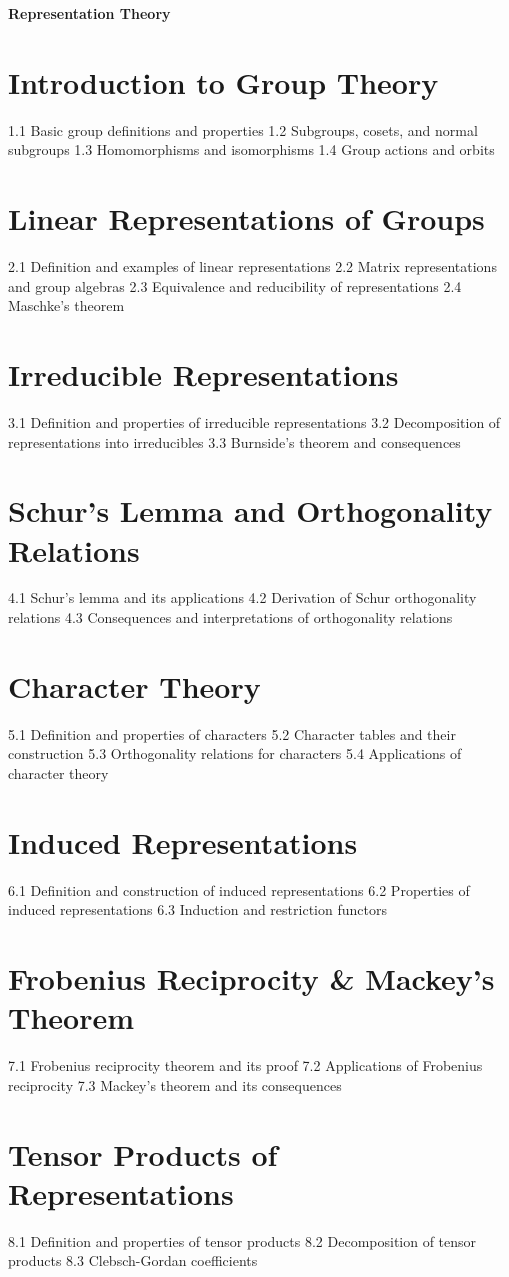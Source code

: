 {\LARGE \bf{Representation Theory}}
\section{Introduction to Group Theory}
1.1 Basic group definitions and properties
1.2 Subgroups, cosets, and normal subgroups
1.3 Homomorphisms and isomorphisms
1.4 Group actions and orbits
\section{Linear Representations of Groups}
2.1 Definition and examples of linear representations
2.2 Matrix representations and group algebras
2.3 Equivalence and reducibility of representations
2.4 Maschke's theorem
\section{Irreducible Representations}
3.1 Definition and properties of irreducible representations
3.2 Decomposition of representations into irreducibles
3.3 Burnside's theorem and consequences
\section{Schur's Lemma and Orthogonality Relations}
4.1 Schur's lemma and its applications
4.2 Derivation of Schur orthogonality relations
4.3 Consequences and interpretations of orthogonality relations
\section{Character Theory}
5.1 Definition and properties of characters
5.2 Character tables and their construction
5.3 Orthogonality relations for characters
5.4 Applications of character theory
\section{Induced Representations}
6.1 Definition and construction of induced representations
6.2 Properties of induced representations
6.3 Induction and restriction functors
\section{Frobenius Reciprocity \& Mackey's Theorem}
7.1 Frobenius reciprocity theorem and its proof
7.2 Applications of Frobenius reciprocity
7.3 Mackey's theorem and its consequences
\section{Tensor Products of Representations}
8.1 Definition and properties of tensor products
8.2 Decomposition of tensor products
8.3 Clebsch-Gordan coefficients
